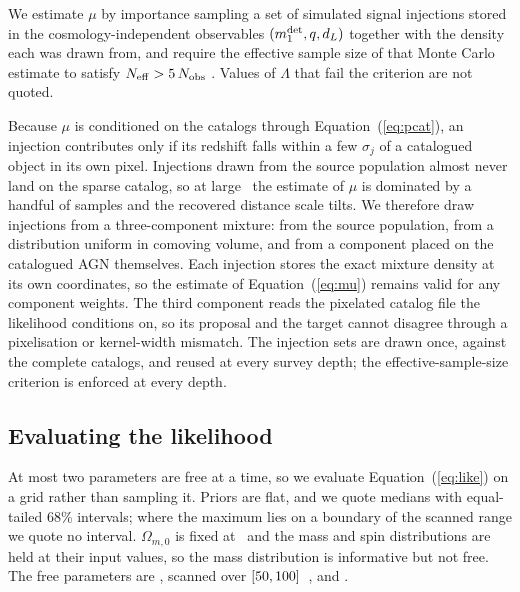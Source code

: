 We estimate $\mu$ by importance sampling a set of simulated signal injections
stored in the cosmology-independent observables
$(m_1^{\rm det}, q, d_L)$ together with the density each was drawn from, and
require the effective sample size of that Monte Carlo estimate to satisfy
$N_{\rm eff} > 5\,N_{\rm obs}$ \citep{Farr2019}. Values of $\Lambda$ that fail
the criterion are not quoted.

Because $\mu$ is conditioned on the catalogs through Equation~(\ref{eq:pcat}),
an injection contributes only if its redshift falls within a few $\sigma_j$ of
a catalogued object in its own pixel. Injections drawn from the source
population almost never land on the sparse catalog, so at large \fagn\ the
estimate of $\mu$ is dominated by a handful of samples and the recovered
distance scale tilts. We therefore draw injections from a three-component
mixture: from the source population, from a distribution uniform in comoving
volume, and from a component placed on the catalogued AGN themselves. Each
injection stores the exact mixture density at its own coordinates, so the
estimate of Equation~(\ref{eq:mu}) remains valid for any component weights. The
third component reads the pixelated catalog file the likelihood conditions on,
so its proposal and the target cannot disagree through a pixelisation or
kernel-width mismatch. The injection sets are drawn once, against the
complete catalogs, and reused at every survey depth; the
effective-sample-size criterion is enforced at every depth.

\subsection{Evaluating the likelihood}
\label{sec:methods:inference}

At most two parameters are free at a time, so we evaluate
Equation~(\ref{eq:like}) on a grid rather than sampling it. Priors are flat, and
we quote medians with equal-tailed 68\% intervals; where the maximum lies on a
boundary of the scanned range we quote no interval. $\Omega_{m,0}$ is fixed at
\OmZeroTruth\ and the mass and spin distributions are held at their input
values, so the mass distribution is informative but not free. The free
parameters are \Hz, scanned over
$[50, 100]$~\kmsmpc, and \fagn.
